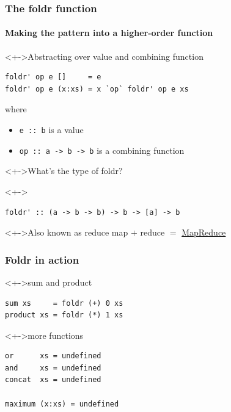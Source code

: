 \documentclass{beamer}
\begin{document}
\begin{frame}[fragile]
  \frametitle{The foldr function}
  \framesubtitle{Making the pattern into a higher-order function}
  \begin{block}<+->{Abstracting over value and combining function}
\begin{verbatim}
foldr' op e []     = e
foldr' op e (x:xs) = x `op` foldr' op e xs
\end{verbatim}
    where
    \begin{itemize}
    \item \texttt{e :: b} is a value
    \item \texttt{op :: a -> b -> b} is a combining function
    \end{itemize}
  \end{block}
  \begin{alertblock}<+->{What's the type of foldr?}
    \vspace{-\baselineskip}
  \end{alertblock}
  \begin{block}<+->{}
\begin{verbatim}
foldr' :: (a -> b -> b) -> b -> [a] -> b
\end{verbatim}
  \end{block}
  \begin{alertblock}<+->{Also known as reduce}
    map $+$ reduce $=$ \href{https://en.wikipedia.org/wiki/MapReduce}{MapReduce}
  \end{alertblock}
\end{frame}
\begin{frame}[fragile]
  \frametitle{Foldr in action}
  \begin{block}<+->{sum and product}
\begin{verbatim}
sum xs     = foldr (+) 0 xs
product xs = foldr (*) 1 xs
\end{verbatim}
  \end{block}
  \begin{block}<+->{more functions}
\begin{verbatim}
or      xs = undefined
and     xs = undefined
concat  xs = undefined

maximum (x:xs) = undefined
\end{verbatim}
  \end{block}
\end{frame}
\end{document}
